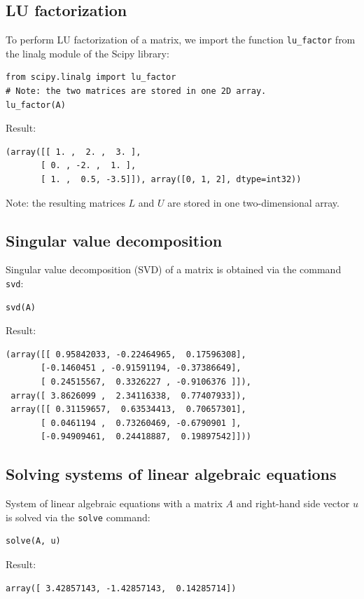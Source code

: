 \documentclass[article,A4,12pt]{llncs}
\begin{document}
\subsection{LU factorization}

To perform LU factorization of a matrix, we import the function {\tt lu\_factor}
from the linalg module of the Scipy library:
\begin{verbatim}
from scipy.linalg import lu_factor
# Note: the two matrices are stored in one 2D array.
lu_factor(A)
\end{verbatim}
Result:
\begin{verbatim}
(array([[ 1. ,  2. ,  3. ],
       [ 0. , -2. ,  1. ],
       [ 1. ,  0.5, -3.5]]), array([0, 1, 2], dtype=int32))
\end{verbatim}
Note: the resulting matrices $L$ and $U$ are stored in one two-dimensional array.

\subsection{Singular value decomposition}

Singular value decomposition (SVD) of a matrix is obtained via the command {\tt svd}:
\begin{verbatim}
svd(A)
\end{verbatim}
Result:
\begin{verbatim}
(array([[ 0.95842033, -0.22464965,  0.17596308],
       [-0.1460451 , -0.91591194, -0.37386649],
       [ 0.24515567,  0.3326227 , -0.9106376 ]]), 
 array([ 3.8626099 ,  2.34116338,  0.77407933]), 
 array([[ 0.31159657,  0.63534413,  0.70657301],
       [ 0.0461194 ,  0.73260469, -0.6790901 ],
       [-0.94909461,  0.24418887,  0.19897542]]))
\end{verbatim}


\subsection{Solving systems of linear algebraic equations}

System of linear algebraic equations with a matrix $A$ and right-hand 
side vector $u$ is solved via the {\tt solve} command:
\begin{verbatim}
solve(A, u)
\end{verbatim}
Result:
\begin{verbatim}
array([ 3.42857143, -1.42857143,  0.14285714])
\end{verbatim}
\end{document}

